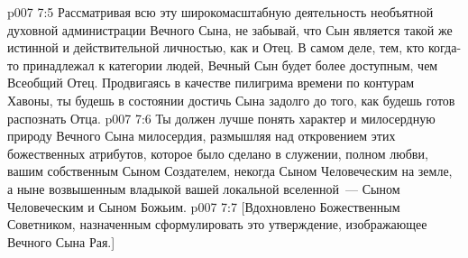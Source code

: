 \vs p007 7:5 \pc Рассматривая всю эту широкомасштабную деятельность необъятной духовной администрации Вечного Сына, не забывай, что Сын является такой же истинной и действительной личностью, как и Отец. В самом деле, тем, кто когда\hyp{}то принадлежал к категории людей, Вечный Сын будет более доступным, чем Всеобщий Отец. Продвигаясь в качестве пилигрима времени по контурам Хавоны, ты будешь в состоянии достичь Сына задолго до того, как будешь готов распознать Отца.
\vs p007 7:6 Ты должен лучше понять характер и милосердную природу Вечного Сына милосердия, размышляя над откровением этих божественных атрибутов, которое было сделано в служении, полном любви, вашим собственным Сыном Создателем, некогда Сыном Человеческим на земле, а ныне возвышенным владыкой вашей локальной вселенной~--- Сыном Человеческим и Сыном Божьим.
\vsetoff
\vs p007 7:7 [Вдохновлено Божественным Советником, назначенным сформулировать это утверждение, изображающее Вечного Сына Рая.]
\quizlink

